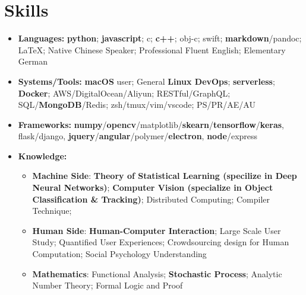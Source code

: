 \documentclass[letterpaper,11pt]{article}
\newcommand{\resumeItem}[2]{
  \item\small{
    \textbf{#1}{: #2 \vspace{-2pt}}
  }
}
\newcommand{\resumeSubHeadingListStart}{\begin{itemize}[leftmargin=*]}
\newcommand{\resumeSubHeadingListEnd}{\end{itemize}}
\newcommand{\resumeItemListStart}{\begin{itemize}}
\newcommand{\resumeItemListEnd}{\end{itemize}\vspace{-5pt}}
\begin{document}
\section{Skills}
 \resumeSubHeadingListStart
   \item{
     \textbf{Languages:}{ 
      \textbf{python}; \textbf{javascript}; 
      c; \textbf{c++}; obj-c; swift; 
      \textbf{markdown}/pandoc; \LaTeX; 
      Native Chinese Speaker; Professional Fluent English; Elementary German
     }
   }
   \item{
    \textbf{Systems/Tools:}{ 
      \textbf{macOS} user; General \textbf{Linux DevOps}; \textbf{serverless};
      \textbf{Docker}; AWS/DigitalOcean/Aliyun; 
      RESTful/GraphQL;
      SQL/\textbf{MongoDB}/Redis; 
      zsh/tmux/vim/vscode; 
      PS/PR/AE/AU
    }
   }
   \item{
    \textbf{Frameworks:}{ 
      \textbf{numpy}/\textbf{opencv}/matplotlib/\textbf{skearn}/\textbf{tensorflow}/\textbf{keras}, 
      flask/django, 
      \textbf{jquery}/\textbf{angular}/polymer/\textbf{electron}, 
      \textbf{node}/express
    }
   }
   \item{
     \textbf{Knowledge:}{ 
       \resumeItemListStart
        \resumeItem{Machine Side}
        { 
          \textbf{Theory of Statistical Learning (specilize in Deep Neural Networks)};
          \textbf{Computer Vision (specialize in Object Classification & Tracking)}; 
          Distributed Computing; 
          Compiler Technique; 
        }
        \resumeItem{Human Side}
          { 
            \textbf{Human-Computer Interaction}; 
            Large Scale User Study; 
            Quantified User Experiences; 
            Crowdsourcing design for Human Computation; 
            Social Psychology Understanding
          }
        \resumeItem{Mathematics}
          { 
            Functional Analysis; 
            \textbf{Stochastic Process}; 
            Analytic Number Theory; 
            Formal Logic and Proof
          }
      \resumeItemListEnd
     }
   }
 \resumeSubHeadingListEnd
\end{document}
